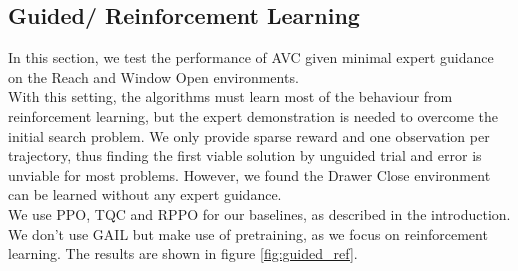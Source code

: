 \subsection{Guided/ Reinforcement Learning}
\label{sec:g_ref_ler}
In this section, we test the performance of AVC given minimal expert guidance on the Reach and Window Open environments. \\
With this setting, the algorithms must learn most of the behaviour from reinforcement learning, but the expert
demonstration is needed to overcome the initial search problem. We only provide sparse reward and one observation per trajectory, thus finding the first viable solution by unguided
trial and error is unviable for most problems. However, we found the Drawer Close environment can be learned without any expert guidance.\\

We use PPO, TQC and RPPO for our baselines, as described in the introduction. We don't use GAIL but make use of pretraining, as we focus on reinforcement learning. The results
are shown in figure \ref{fig:guided_ref}.\\

